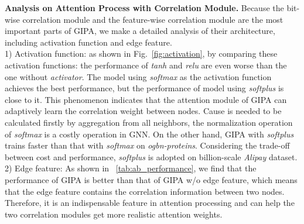 \documentclass[runningheads]{llncs}
\newcommand{\model}{GIPA\xspace}
\begin{document}
\noindent \textbf{Analysis on Attention Process with Correlation Module.} Because the bit-wise correlation module and the feature-wise correlation module are the most important parts of \model, we make a detailed analysis of their architecture, including activation function and edge feature.
\\
1) Activation function: as shown in Fig.~\ref{fig:activation}, by comparing these activation functions: the performance of \textit{tanh} and \textit{relu} are even worse than the one without \textit{activator}.
The model using \textit{softmax} as the activation function achieves the best performance, but the performance of model using \textit{softplus} is close to it.
This phenomenon indicates that the attention module of \model can adaptively learn the correlation weight between nodes. 
Cause  is needed to be calculated firstly by aggregation from all neighbors, the normalization operation of \textit{softmax} is a costly operation in GNN. 
On the other hand, \model with \textit{softplus} trains faster than that with \textit{softmax} on \textit{ogbn-proteins}.
Considering the trade-off between cost and performance, \textit{softplus} is adopted on billion-scale \textit{Alipay} dataset.
\\
2) Edge feature: As shown in \tablename~\ref{tab:ab_performance}, we find that the performance of \model is better than that of \model w/o edge feature, which means that the edge feature contains the correlation information between two nodes. Therefore, it is an indispensable feature in attention processing and can help the two correlation modules get more realistic attention weights.
\end{document}
